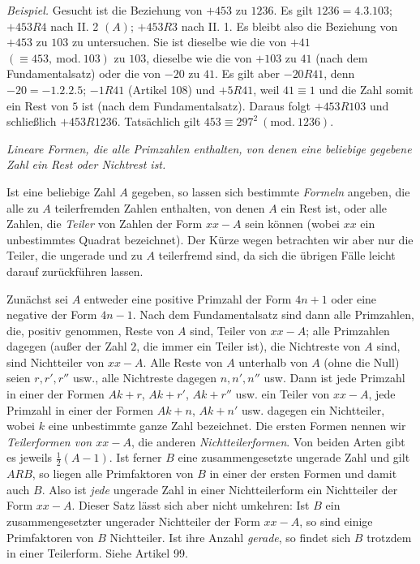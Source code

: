 \textit{Beispiel.} Gesucht ist die Beziehung von $+453$ zu $1236$. Es gilt $1236=4.3.103$; $+453R4$ nach II. 2 $(A)$; $+453R3$ nach II. 1. Es bleibt also die Beziehung von $+453$ zu $103$ zu untersuchen. Sie ist dieselbe wie die von $+41$ $(\equiv453,\ \mathrm{mod.}\ 103)$ zu $103$, dieselbe wie die von $+103$ zu $41$ (nach dem Fundamentalsatz) oder die von $-20$ zu $41$. Es gilt aber $-20R41$, denn $-20=-1.2.2.5$; $-1R41$ (Artikel 108) und $+5R41$, weil $41\equiv1$ und die Zahl somit ein Rest von $5$ ist (nach dem Fundamentalsatz). Daraus folgt $+453R103$ und schließlich $+453R1236$. Tatsächlich gilt $453\equiv297^2\ (\mathrm{mod.}\ 1236)$.

\begin{center}\textit{Lineare Formen, die alle Primzahlen enthalten, von denen eine beliebige gegebene Zahl ein Rest oder Nichtrest ist.}\end{center}

Ist eine beliebige Zahl $A$ gegeben, so lassen sich bestimmte \textit{Formeln} angeben, die alle zu $A$ teilerfremden Zahlen enthalten, von denen $A$ ein Rest ist, oder alle Zahlen, die \textit{Teiler} von Zahlen der Form $xx-A$ sein können (wobei $xx$ ein unbestimmtes Quadrat bezeichnet). Der Kürze wegen betrachten wir aber nur die Teiler, die ungerade und zu $A$ teilerfremd sind, da sich die übrigen Fälle leicht darauf zurückführen lassen.

Zunächst sei $A$ entweder eine positive Primzahl der Form $4n+1$ oder eine negative der Form $4n-1$. Nach dem Fundamentalsatz sind dann alle Primzahlen, die, positiv genommen, Reste von $A$ sind, Teiler von $xx-A$; alle Primzahlen dagegen (außer der Zahl $2$, die immer ein Teiler ist), die Nichtreste von $A$ sind, sind Nichtteiler von $xx-A$. Alle Reste von $A$ unterhalb von $A$ (ohne die Null) seien $r,r',r''$ usw., alle Nichtreste dagegen $n,n',n''$ usw. Dann ist jede Primzahl in einer der Formen $Ak+r$, $Ak+r'$, $Ak+r''$ usw. ein Teiler von $xx-A$, jede Primzahl in einer der Formen $Ak+n$, $Ak+n'$ usw. dagegen ein Nichtteiler, wobei $k$ eine unbestimmte ganze Zahl bezeichnet. Die ersten Formen nennen wir \textit{Teilerformen von $xx-A$}, die anderen \textit{Nichtteilerformen}. Von beiden Arten gibt es jeweils $\frac{1}{2}(A-1)$. Ist ferner $B$ eine zusammengesetzte ungerade Zahl und gilt $ARB$, so liegen alle Primfaktoren von $B$ in einer der ersten Formen und damit auch $B$. Also ist \textit{jede} ungerade Zahl in einer Nichtteilerform ein Nichtteiler der Form $xx-A$. Dieser Satz lässt sich aber nicht umkehren: Ist $B$ ein zusammengesetzter ungerader Nichtteiler der Form $xx-A$, so sind einige Primfaktoren von $B$ Nichtteiler. Ist ihre Anzahl \textit{gerade}, so findet sich $B$ trotzdem in einer Teilerform. Siehe Artikel 99.

